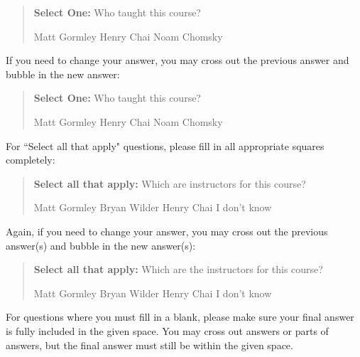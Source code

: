 \documentclass[11pt,addpoints,answers]{exam}
\newcommand{\blackcircle}{\tikz\draw[black,fill=black] (0,0) circle (1ex);}
\begin{document}
\begin{quote}
\textbf{Select One:} Who taught this course?
    \begin{checkboxes}
     \CorrectChoice Matt Gormley
     \choice Henry Chai
     \choice Noam Chomsky
    \end{checkboxes}
\end{quote}

If you need to change your answer, you may cross out the previous answer and bubble in the new answer:

\begin{quote}
\textbf{Select One:} Who taught this course?
    {
    \begin{checkboxes}
     \CorrectChoice Matt Gormley
     \choice Henry Chai \checkboxchar{\xcancel{\blackcircle}{}}
     \choice Noam Chomsky
    \end{checkboxes}
    }
\end{quote}

For ``Select all that apply" questions, please fill in all appropriate squares completely:

\begin{quote}
\textbf{Select all that apply:} Which are instructors for this course?
    {%
    \checkboxchar{$\Box$} \checkedchar{$\blacksquare$} %
    \begin{checkboxes}
    \CorrectChoice Matt Gormley  
    \CorrectChoice Bryan Wilder
    \choice Henry Chai
    \choice I don't know
    \end{checkboxes}
    }
\end{quote}

Again, if you need to change your answer, you may cross out the previous answer(s) and bubble in the new answer(s):

\begin{quote}
\textbf{Select all that apply:} Which are the instructors for this course?
    {%
    \checkboxchar{\xcancel{$\blacksquare$}} \checkedchar{$\blacksquare$} %
    \begin{checkboxes}
    \CorrectChoice Matt Gormley 
    \CorrectChoice Bryan Wilder
    \choice Henry Chai
    \choice I don't know
    \end{checkboxes}
    }
\end{quote}

For questions where you must fill in a blank, please make sure your final answer is fully included in the given space. You may cross out answers or parts of answers, but the final answer must still be within the given space.
\end{document}
